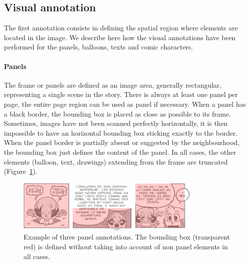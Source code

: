 
\subsection{Visual annotation} %
\label{sub:visual_annotation}
The first annotation consists in defining the spatial region where elements are located in the image.
We describe here how the visual annotations have been performed for the panels, balloons, texts and comic characters.

\paragraph{Panels} %
\label{par:panels}
The frame or panels are defined as an image area, generally rectangular, representing a single scene in the story. 
There is always at least one panel per page, the entire page region can be used as panel if necessary.
When a panel has a black border, the bounding box is placed as close as possible to its frame.
Sometimes, images have not been scanned perfectly horizontally, it is then impossible to have an horizontal bounding box sticking exactly to the border.
When the panel border is partially absent or suggested by the neighbourhood, the bounding box just defines the content of the panel.
In all cases, the other elements (balloon, text, drawings) extending from the frame are truncated (Figure~\ref{fig:gt:segPanel}).

\begin{figure}[h!]
\begin{center}
\includegraphics[width=0.8\textwidth]{segPanel.png}
\caption[Panel annotation]{Example of three panel annotations. The bounding box (transparent red) is defined without taking into account of non panel elements in all cases.}
\label{fig:gt:segPanel}
\end{center}
\end{figure}

